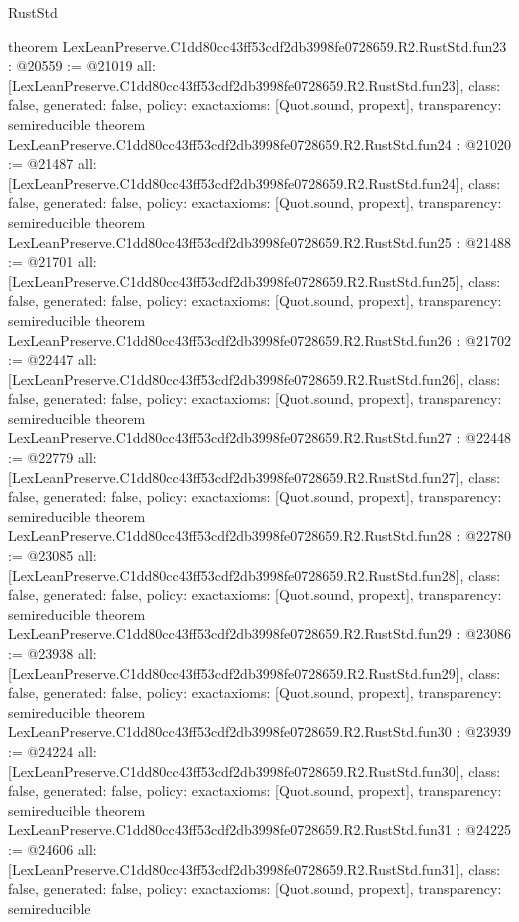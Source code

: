 \begin{lexlean}{RustStd}
\begin{coremodule}
{}
theorem LexLeanPreserve.C1dd80cc43ff53cdf2db3998fe0728659.R2.RustStd.fun23 : @20559 := @21019 {
  all: [LexLeanPreserve.C1dd80cc43ff53cdf2db3998fe0728659.R2.RustStd.fun23],
  class: false,
  generated: false,
  policy: exact{axioms: [Quot.sound, propext]},
  transparency: semireducible
}
theorem LexLeanPreserve.C1dd80cc43ff53cdf2db3998fe0728659.R2.RustStd.fun24 : @21020 := @21487 {
  all: [LexLeanPreserve.C1dd80cc43ff53cdf2db3998fe0728659.R2.RustStd.fun24],
  class: false,
  generated: false,
  policy: exact{axioms: [Quot.sound, propext]},
  transparency: semireducible
}
theorem LexLeanPreserve.C1dd80cc43ff53cdf2db3998fe0728659.R2.RustStd.fun25 : @21488 := @21701 {
  all: [LexLeanPreserve.C1dd80cc43ff53cdf2db3998fe0728659.R2.RustStd.fun25],
  class: false,
  generated: false,
  policy: exact{axioms: [Quot.sound, propext]},
  transparency: semireducible
}
theorem LexLeanPreserve.C1dd80cc43ff53cdf2db3998fe0728659.R2.RustStd.fun26 : @21702 := @22447 {
  all: [LexLeanPreserve.C1dd80cc43ff53cdf2db3998fe0728659.R2.RustStd.fun26],
  class: false,
  generated: false,
  policy: exact{axioms: [Quot.sound, propext]},
  transparency: semireducible
}
theorem LexLeanPreserve.C1dd80cc43ff53cdf2db3998fe0728659.R2.RustStd.fun27 : @22448 := @22779 {
  all: [LexLeanPreserve.C1dd80cc43ff53cdf2db3998fe0728659.R2.RustStd.fun27],
  class: false,
  generated: false,
  policy: exact{axioms: [Quot.sound, propext]},
  transparency: semireducible
}
theorem LexLeanPreserve.C1dd80cc43ff53cdf2db3998fe0728659.R2.RustStd.fun28 : @22780 := @23085 {
  all: [LexLeanPreserve.C1dd80cc43ff53cdf2db3998fe0728659.R2.RustStd.fun28],
  class: false,
  generated: false,
  policy: exact{axioms: [Quot.sound, propext]},
  transparency: semireducible
}
theorem LexLeanPreserve.C1dd80cc43ff53cdf2db3998fe0728659.R2.RustStd.fun29 : @23086 := @23938 {
  all: [LexLeanPreserve.C1dd80cc43ff53cdf2db3998fe0728659.R2.RustStd.fun29],
  class: false,
  generated: false,
  policy: exact{axioms: [Quot.sound, propext]},
  transparency: semireducible
}
theorem LexLeanPreserve.C1dd80cc43ff53cdf2db3998fe0728659.R2.RustStd.fun30 : @23939 := @24224 {
  all: [LexLeanPreserve.C1dd80cc43ff53cdf2db3998fe0728659.R2.RustStd.fun30],
  class: false,
  generated: false,
  policy: exact{axioms: [Quot.sound, propext]},
  transparency: semireducible
}
theorem LexLeanPreserve.C1dd80cc43ff53cdf2db3998fe0728659.R2.RustStd.fun31 : @24225 := @24606 {
  all: [LexLeanPreserve.C1dd80cc43ff53cdf2db3998fe0728659.R2.RustStd.fun31],
  class: false,
  generated: false,
  policy: exact{axioms: [Quot.sound, propext]},
  transparency: semireducible
}
\end{coremodule}
\end{lexlean}
